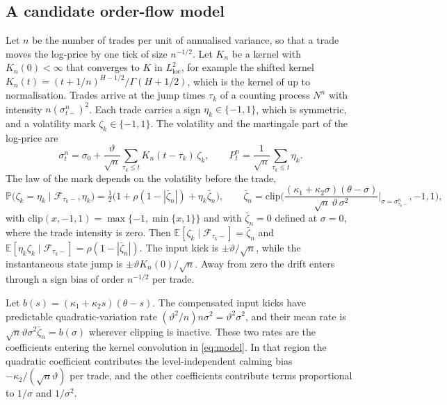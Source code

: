\documentclass{rQUF2e}
\theoremstyle{plain}
\theoremstyle{definition}
\theoremstyle{remark}
\newcommand{\E}{\mathbb{E}}
\renewcommand{\P}{\mathbb{P}}
\newcommand{\F}{\mathcal{F}}
\begin{document}
\subsection{A candidate order-flow model}\label{sec:micro_model}

Let $n$ be the number of trades per unit of annualised variance, so that a trade moves the log-price by one tick of size $n^{-1/2}$. Let $K_n$ be a kernel with $K_n(0)<\infty$ that converges to $K$ in $L^2_{\mathrm{loc}}$, for example the shifted kernel $K_n(t)=(t+1/n)^{H-1/2}/\Gamma(H+1/2)$, which is the kernel of \citet{HagerHorstWagenhoferXu2026} up to normalisation. Trades arrive at the jump times $\tau_k$ of a counting process $N^n$ with intensity $n(\sigma^n_{t-})^2$. Each trade carries a sign $\eta_k\in\{-1,1\}$, which is symmetric, and a volatility mark $\zeta_k\in\{-1,1\}$. The volatility and the martingale part of the log-price are
\begin{equation}\label{eq:micro}
\sigma^n_t=\sigma_0+\frac{\vartheta}{\sqrt n}\sum_{\tau_k\le t}K_n(t-\tau_k)\,\zeta_k,\qquad P^n_t=\frac1{\sqrt n}\sum_{\tau_k\le t}\eta_k .
\end{equation}
The law of the mark depends on the volatility before the trade,
\begin{equation}\label{eq:bias}
\P\big(\zeta_k=\eta_k\mid\F_{\tau_k-},\eta_k\big)=\tfrac12\big(1+\rho(1-|\bar\zeta_n|)+\eta_k\bar\zeta_n\big),\qquad \bar\zeta_n=\mathrm{clip}\bigg(\frac{(\kappa_1+\kappa_2\sigma)(\theta-\sigma)}{\sqrt n\,\vartheta\,\sigma^2}\bigg|_{\sigma=\sigma^n_{\tau_k-}},-1,1\bigg),
\end{equation}
with $\mathrm{clip}(x,-1,1)=\max\{-1,\min\{x,1\}\}$ and with $\bar\zeta_n=0$ defined at $\sigma=0$, where the trade intensity is zero. Then $\E[\zeta_k\mid\F_{\tau_k-}]=\bar\zeta_n$ and $\E[\eta_k\zeta_k\mid\F_{\tau_k-}]=\rho(1-|\bar\zeta_n|)$. The input kick is $\pm\vartheta/\sqrt n$, while the instantaneous state jump is $\pm\vartheta K_n(0)/\sqrt n$. Away from zero the drift enters through a sign bias of order $n^{-1/2}$ per trade.

Let $b(s)=(\kappa_1+\kappa_2s)(\theta-s)$. The compensated input kicks have predictable quadratic-variation rate $(\vartheta^2/n)n\sigma^2=\vartheta^2\sigma^2$, and their mean rate is $\sqrt n\vartheta\sigma^2\bar\zeta_n=b(\sigma)$ wherever clipping is inactive. These two rates are the coefficients entering the kernel convolution in \eqref{eq:model}. In that region the quadratic coefficient contributes the level-independent calming bias $-\kappa_2/(\sqrt n\vartheta)$ per trade, and the other coefficients contribute terms proportional to $1/\sigma$ and $1/\sigma^2$.
\end{document}
